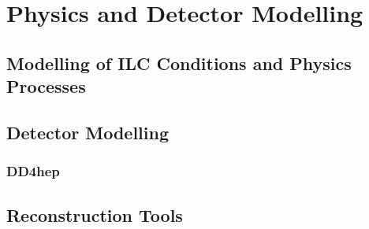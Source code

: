 \chapter{Physics and Detector Modelling}

\section{Modelling of ILC Conditions and Physics Processes}



\section{Detector Modelling}

\subsection{DD4hep}

\section{Reconstruction Tools}
